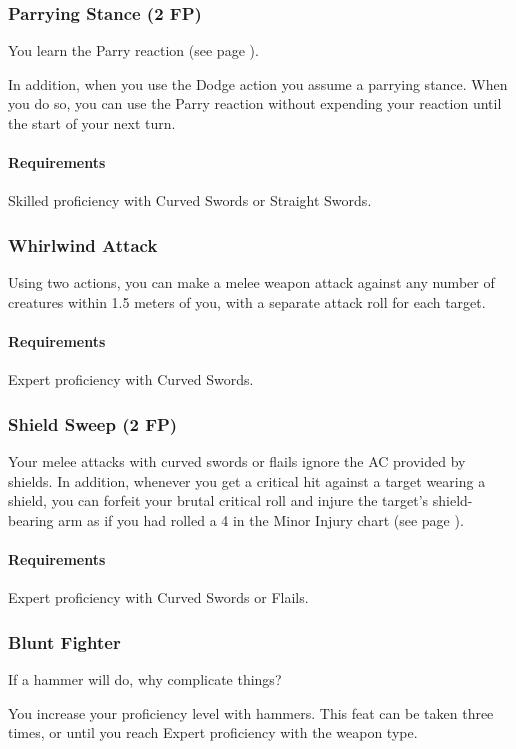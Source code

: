 \subsubsection{Parrying Stance (2 FP)} \label{feat::parryingstance}
    You learn the Parry reaction (see page \pageref{act::parry}).

    In addition, when you use the Dodge action you assume a parrying stance.
    When you do so, you can use the Parry reaction without expending your reaction until the start of your next turn.
    \paragraph{Requirements} Skilled proficiency with Curved Swords or Straight Swords.
\subsubsection{Whirlwind Attack} \label{feat::whirlwindattack}
    Using two actions, you can make a melee weapon attack against any number of creatures within 1.5 meters of you, with a separate attack roll for each target.
    \paragraph{Requirements} Expert proficiency with Curved Swords.
\subsubsection{Shield Sweep (2 FP)} \label{feat::shieldsweep}
    Your melee attacks with curved swords or flails ignore the AC provided by shields.
    In addition, whenever you get a critical hit against a target wearing a shield, you can forfeit your brutal critical roll and injure the target's shield-bearing arm as if you had rolled a 4 in the Minor Injury chart (see page \pageref{ssec::injuriesandinsanity}).
    \paragraph{Requirements} Expert proficiency with Curved Swords or Flails.
\subsubsection{Blunt Fighter} \label{feat::bluntfighter}
    If a hammer will do, why complicate things?

    You increase your proficiency level with hammers.
    This feat can be taken three times, or until you reach Expert proficiency with the weapon type.
